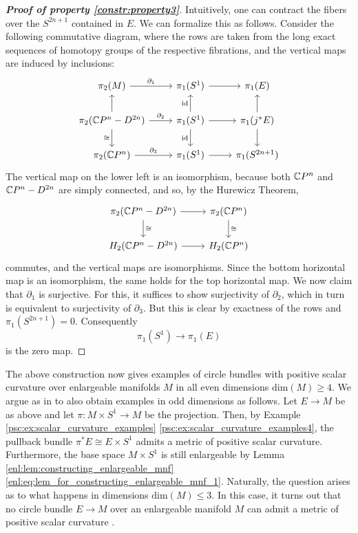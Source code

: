 \begin{proof}[\normalfont\textbf{Proof of property \ref{constr:property3}}]
Intuitively, one can contract the fibers over the $S^{2n+1}$ contained in $E$. We can formalize this as follows. Consider the following commutative diagram, where the rows are taken from the long exact sequences of homotopy groups of the respective fibrations, and the vertical maps are induced by inclusions: 
	\[\begin{tikzcd}
	{\pi_2(M)} & {\pi_1(S^1)} & {\pi_1(E)} \\
	{\pi_2(\CP^n - D^{2n})} & {\pi_1(S^1)} & {\pi_1(j^\ast E)} \\
	{\pi_2(\CP^n)} & {\pi_1(S^1)} & {\pi_1(S^{2n+1})}
	\arrow["{\partial_1}", from=1-1, to=1-2]
	\arrow[from=1-2, to=1-3]
	\arrow[from=2-1, to=1-1]
	\arrow["{\partial_2}", from=2-1, to=2-2]
	\arrow["\cong"', from=2-1, to=3-1]
	\arrow["{\mathrm{id}}", from=2-2, to=1-2]
	\arrow[from=2-2, to=2-3]
	\arrow["{\mathrm{id}}"', from=2-2, to=3-2]
	\arrow[from=2-3, to=1-3]
	\arrow[from=2-3, to=3-3]
	\arrow["{\partial_3}", from=3-1, to=3-2]
	\arrow[from=3-2, to=3-3]
\end{tikzcd}\]
The vertical map on the lower left is an isomorphism, because both $\mathbb{C} P^n$ and $\mathbb{C} P^n - D^{2n}$ are simply connected, and so, by the Hurewicz Theorem,
\[\begin{tikzcd}
	{\pi_2(\CP^n-D^{2n})} & {\pi_2(\CP^n)} \\
	{H_2(\CP^n-D^{2n})} & {H_2(\CP^n)}
	\arrow[from=1-1, to=1-2]
	\arrow["\cong", from=1-1, to=2-1]
	\arrow["\cong", from=1-2, to=2-2]
	\arrow[from=2-1, to=2-2]
\end{tikzcd}\]
commutes, and the vertical maps are isomorphisms. Since the bottom horizontal map is an isomorphism, the same holds for the top horizontal map.
We now claim that $\partial_1$ is surjective. For this, it suffices to show surjectivity of $\partial_2$, which in turn is equivalent to surjectivity of $\partial_3$. But this is clear by exactness of the rows and $\pi_1(S^{2n+1}) = 0$. Consequently
\[
\pi_1(S^1) \to \pi_1(E)
\]
is the zero map.
\end{proof}

The above construction now gives examples of circle bundles with positive scalar curvature over enlargeable manifolds $M$ in all even dimensions $\mathrm{dim}(M)\geq 4$. We argue as in \cite{kumar2025circle} to also obtain examples in odd dimensions as follows. Let $E \to M$ be as above and let $\pi \colon M \times S^1 \to M$ be the projection. Then, by Example \ref{psc:ex:scalar_curvature_examples} \ref{psc:ex:scalar_curvature_examples4}, the pullback bundle $\pi^\ast E \cong E \times S^1$ admits a metric of positive scalar curvature. Furthermore, the base space $M \times S^1$ is still enlargeable by Lemma \ref{enl:lem:constructing_enlargeable_mnf} \ref{enl:eq:lem_for_constructing_enlargeable_mnf_1}. Naturally, the question arises as to what happens in dimensions $\mathrm{dim}(M) \leq 3$. In this case, it turns out that no circle bundle $E \to M$ over an enlargeable manifold $M$ can admit a metric of positive scalar curvature \cite[Thm. B, Remark 2]{kumar2025circle}.

